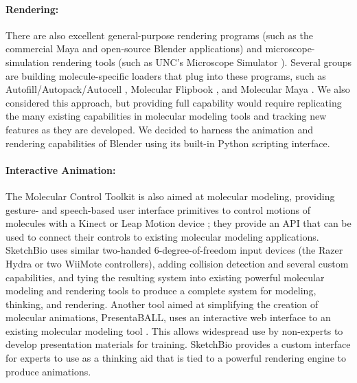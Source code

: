 \documentclass[twocolumn]{bmcart}%
\begin{document}
\paragraph*{Rendering:}
There are also excellent general-purpose rendering programs (such as the commercial Maya and open-source Blender applications) and microscope-simulation rendering tools (such as UNC's Microscope Simulator \cite{quammen2008}).  Several groups are building molecule-specific loaders that plug into these programs, such as Autofill/Autopack/Autocell \cite{Johnson 2013}, Molecular Flipbook \cite{flipbook2013}, and Molecular Maya \cite{molecularmaya}.  We also considered this approach, but providing full capability would require replicating the many existing capabilities in molecular modeling tools and tracking new features as they are developed.  We decided to harness the animation and rendering capabilities of Blender using its built-in Python scripting interface.

\paragraph*{Interactive Animation:}
The Molecular Control Toolkit \cite{sabirmolecular} is also aimed at molecular modeling, providing gesture- and speech-based user interface primitives to control motions of molecules with a Kinect or Leap Motion device \cite{sabirmolecular}; they provide an API that can be used to connect their controls to existing molecular modeling applications.  SketchBio uses similar two-handed 6-degree-of-freedom input devices (the Razer Hydra or two WiiMote controllers), adding collision detection and several custom capabilities, and tying the resulting system into existing powerful molecular modeling and rendering tools to produce a complete system for modeling, thinking, and rendering.  Another tool aimed at simplifying the creation of molecular animations, PresentaBALL\cite{nickelspresentaball}, uses an interactive web interface to an existing molecular modeling tool \cite{nickelspresentaball}.  This allows widespread use by non-experts to develop presentation materials for training.  SketchBio provides a custom interface for experts to use as a thinking aid that is tied to a powerful rendering engine to produce animations.
\end{document}

